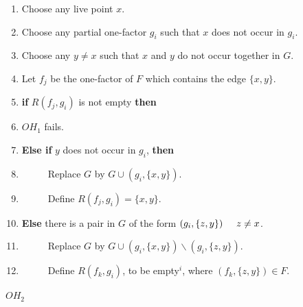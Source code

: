 \documentclass[
  12pt,
  a4paper]{book}
\begin{document}
\begin{enumerate}
\def\labelenumi{\arabic{enumi}.}
\item
  Choose any live point \(x\).
\item
  Choose any partial one-factor \(g_i\) such that \(x\) does not occur
  in \(g_i\).
\item
  Choose any \(y \neq x\) such that \(x\) and \(y\) do not occur
  together in \(G\).
\item
  Let \(f_j\) be the one-factor of \(F\) which contains the edge
  \(\{x,y\}\).
\item
  \textbf{if} \(R(f_j,g_i)\) is not empty \textbf{then}
\item
  \(OH_1\) fails.
\item
  \textbf{Else if} \(y\) does not occur in \(g_i\), \textbf{then}
\item
  \(\hspace{1cm}\) Replace \(G\) by \(G \cup (g_i,\{x,y\})\).
\item
  \(\hspace{1cm}\) Define \(R(f_j,g_i)=\{x,y\}\).
\item
  \textbf{Else} there is a pair in \(G\) of the form
  \((g_i,\{z,y\}) \hspace{0.5cm} z \neq x\).
\item
  \(\hspace{1cm}\) Replace \(G\) by
  \(G \cup (g_i,\{x,y\}) \backslash (g_i,\{z,y\})\).
\item
  \(\hspace{1cm}\) Define \(R(f_k,g_i)\), to be empty\(^i\), where
  \((f_k,\{z,y\}) \in F\).
\end{enumerate}

\(OH_2\)
\end{document}
